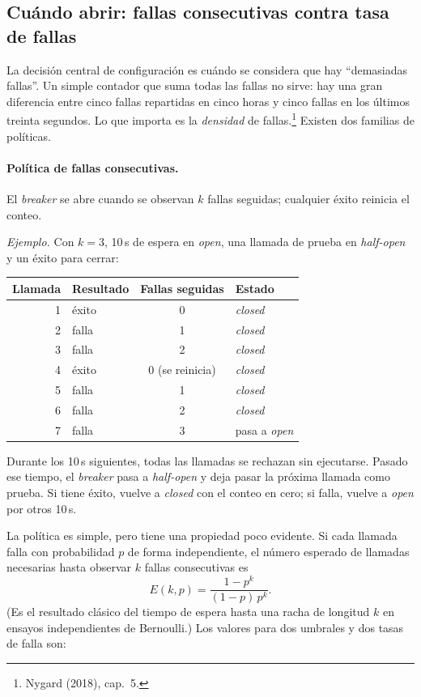 \documentclass[variant=apuntes,cover=institutional,mode=screen]{ua-engineering-v6-article}
\begin{document}
\subsection{Cuándo abrir: fallas consecutivas contra tasa de fallas}

La decisión central de configuración es cuándo se considera que hay ``demasiadas fallas''. Un simple contador que suma todas las fallas no sirve: hay una gran diferencia entre cinco fallas repartidas en cinco horas y cinco fallas en los últimos treinta segundos. Lo que importa es la \emph{densidad} de fallas.\footnote{Nygard (2018), cap.~5.} Existen dos familias de políticas.

\paragraph{Política de fallas consecutivas.} El \emph{breaker} se abre cuando se observan $k$ fallas seguidas; cualquier éxito reinicia el conteo.

\emph{Ejemplo.} Con $k = 3$, 10\,s de espera en \emph{open}, una llamada de prueba en \emph{half-open} y un éxito para cerrar:

\begin{center}
\begin{tabular}{rlcl}
\toprule
\textbf{Llamada} & \textbf{Resultado} & \textbf{Fallas seguidas} & \textbf{Estado} \\
\midrule
1 & éxito & 0 & \emph{closed} \\
2 & falla & 1 & \emph{closed} \\
3 & falla & 2 & \emph{closed} \\
4 & éxito & 0 (se reinicia) & \emph{closed} \\
5 & falla & 1 & \emph{closed} \\
6 & falla & 2 & \emph{closed} \\
7 & falla & 3 & pasa a \emph{open} \\
\bottomrule
\end{tabular}
\end{center}

Durante los 10\,s siguientes, todas las llamadas se rechazan sin ejecutarse. Pasado ese tiempo, el \emph{breaker} pasa a \emph{half-open} y deja pasar la próxima llamada como prueba. Si tiene éxito, vuelve a \emph{closed} con el conteo en cero; si falla, vuelve a \emph{open} por otros 10\,s.

La política es simple, pero tiene una propiedad poco evidente. Si cada llamada falla con probabilidad $p$ de forma independiente, el número esperado de llamadas necesarias hasta observar $k$ fallas consecutivas es
\[
E(k,p) = \frac{1 - p^{k}}{(1-p)\,p^{k}}.
\]
(Es el resultado clásico del tiempo de espera hasta una racha de longitud $k$ en ensayos independientes de Bernoulli.) Los valores para dos umbrales y dos tasas de falla son:
\end{document}

